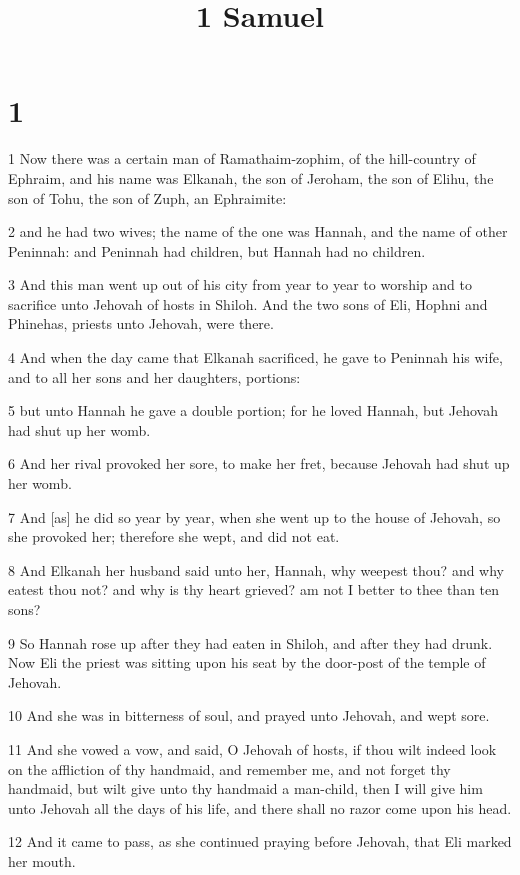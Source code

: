 

\title{1 Samuel}

\chapter{1}

\par 1 Now there was a certain man of Ramathaim-zophim, of the hill-country of Ephraim, and his name was Elkanah, the son of Jeroham, the son of Elihu, the son of Tohu, the son of Zuph, an Ephraimite:
\par 2 and he had two wives; the name of the one was Hannah, and the name of other Peninnah: and Peninnah had children, but Hannah had no children.
\par 3 And this man went up out of his city from year to year to worship and to sacrifice unto Jehovah of hosts in Shiloh. And the two sons of Eli, Hophni and Phinehas, priests unto Jehovah, were there.
\par 4 And when the day came that Elkanah sacrificed, he gave to Peninnah his wife, and to all her sons and her daughters, portions:
\par 5 but unto Hannah he gave a double portion; for he loved Hannah, but Jehovah had shut up her womb.
\par 6 And her rival provoked her sore, to make her fret, because Jehovah had shut up her womb.
\par 7 And [as] he did so year by year, when she went up to the house of Jehovah, so she provoked her; therefore she wept, and did not eat.
\par 8 And Elkanah her husband said unto her, Hannah, why weepest thou? and why eatest thou not? and why is thy heart grieved? am not I better to thee than ten sons?
\par 9 So Hannah rose up after they had eaten in Shiloh, and after they had drunk. Now Eli the priest was sitting upon his seat by the door-post of the temple of Jehovah.
\par 10 And she was in bitterness of soul, and prayed unto Jehovah, and wept sore.
\par 11 And she vowed a vow, and said, O Jehovah of hosts, if thou wilt indeed look on the affliction of thy handmaid, and remember me, and not forget thy handmaid, but wilt give unto thy handmaid a man-child, then I will give him unto Jehovah all the days of his life, and there shall no razor come upon his head.
\par 12 And it came to pass, as she continued praying before Jehovah, that Eli marked her mouth.
